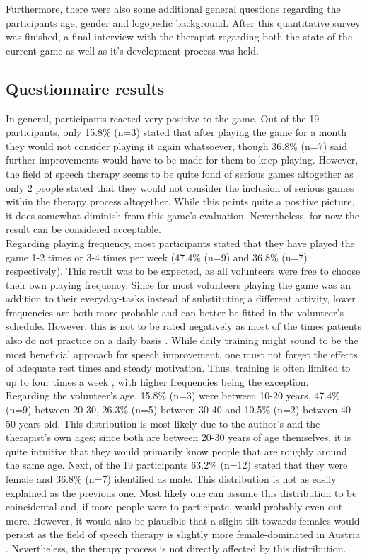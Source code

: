 \documentclass[draft,final]{vutinfth} %
\begin{document}
Furthermore, there were also some additional general questions regarding the participants age, gender and logopedic background. After this quantitative survey was finished, a final interview with the therapist regarding both the state of the current game as well as it's development process was held.

\subsection{Questionnaire results}

In general, participants reacted very positive to the game. Out of the 19 participants, only 15.8\% (n=3) stated that after playing the game for a month they would not consider playing it again whatsoever, though 36.8\% (n=7) said further improvements would have to be made for them to keep playing. However, the field of speech therapy seems to be quite fond of serious games altogether as only 2 people stated that they would not consider the inclusion of serious games within the therapy process altogether. While this paints quite a positive picture, it does somewhat diminish from this game's evaluation. Nevertheless, for now the result can be considered acceptable. \\
Regarding playing frequency, most participants stated that they have played the game 1-2 times or 3-4 times per week (47.4\% (n=9) and 36.8\% (n=7) respectively). This result was to be expected, as all volunteers were free to choose their own playing frequency. Since for most volunteers playing the game was an addition to their everyday-tasks instead of substituting a different activity, lower frequencies are both more probable and can better be fitted in the volunteer's schedule. However, this is not to be rated negatively as most of the times patients also do not practice on a daily basis \cite{proestler2023}. While daily training might sound to be the most beneficial approach for speech improvement, one must not forget the effects of adequate rest times and steady motivation. Thus, training is often limited to up to four times a week \cite{proestler2023}, with higher frequencies being the exception.\\

Regarding the volunteer's age, 15.8\% (n=3) were between 10-20 years, 47.4\% (n=9) between 20-30, 26.3\% (n=5) between 30-40 and 10.5\% (n=2) between 40-50 years old. This distribution is most likely due to the author's and the therapist's own ages; since both are between 20-30 years of age themselves, it is quite intuitive that they would primarily know people that are roughly around the same age. Next, of the 19 participants 63.2\% (n=12) stated that they were female and 36.8\% (n=7) identified as male. This distribution is not as easily explained as the previous one. Most likely one can assume this distribution to be coincidental and, if more people were to participate, would probably even out more. However, it would also be plausible that a slight tilt towards females would persist as the field of speech therapy is slightly more female-dominated in Austria \cite{LogopedicStatistic}. Nevertheless, the therapy process is not directly affected by this distribution.
\end{document}
